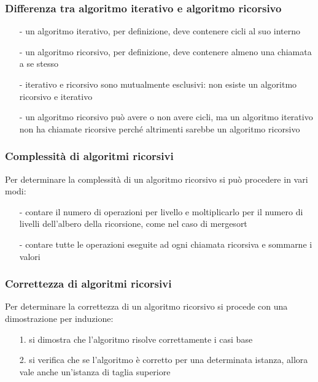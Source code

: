 \documentclass[a4paper]{article}
\begin{document}
\subsubsection*{Differenza tra algoritmo iterativo e algoritmo ricorsivo}
\begin{itemize}[topsep=3pt, itemsep=0pt]
	\item[-] un algoritmo iterativo, per definizione, deve contenere cicli al suo interno
	\item[-] un algoritmo ricorsivo, per definizione, deve contenere almeno una chiamata a se stesso
	\item[-] iterativo e ricorsivo sono mutualmente esclusivi: non esiste un algoritmo ricorsivo e iterativo
	\item[-] un algoritmo ricorsivo può avere o non avere cicli, ma un algoritmo iterativo non ha chiamate ricorsive perché altrimenti
	sarebbe un algoritmo ricorsivo
\end{itemize}

\subsubsection*{Complessità di algoritmi ricorsivi}
Per determinare la complessità di un algoritmo ricorsivo si può procedere in vari modi:
\begin{itemize}[topsep=3pt, itemsep=0pt]
	\item[-] contare il numero di operazioni per livello e moltiplicarlo per il numero di livelli dell'albero della ricorsione, come
	nel caso di mergesort
	\item[-] contare tutte le operazioni eseguite ad ogni chiamata ricorsiva e sommarne i valori
\end{itemize}

\subsubsection*{Correttezza di algoritmi ricorsivi}
Per determinare la correttezza di un algoritmo ricorsivo si procede con una dimostrazione per induzione:
\begin{itemize}[topsep=3pt, itemsep=0pt]
	\item[1.] si dimostra che l'algoritmo risolve correttamente i casi base
	\item[2.] si verifica che se l'algoritmo è corretto per una determinata istanza, allora vale anche un'istanza di taglia superiore
\end{itemize}
\end{document}
